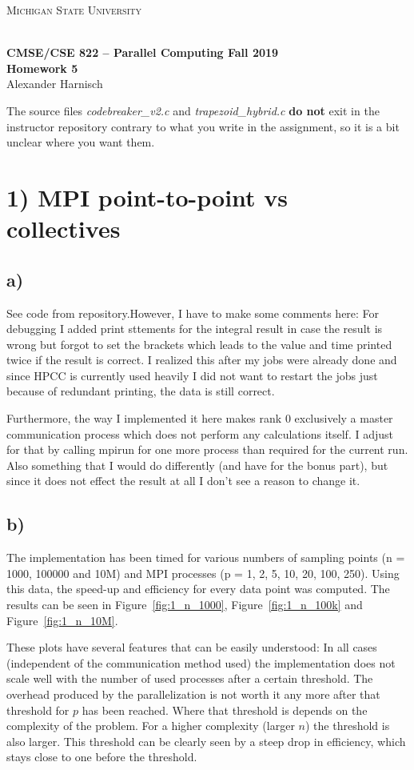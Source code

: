 \documentclass[a4paper, 11pt]{article}
\begin{document}
\noindent
\centerline{\small{\textsc{Michigan State University}}} \\
\large{\textbf{CMSE/CSE 822 – Parallel Computing \hfill Fall 2019 \\
Homework 5}} \\
Alexander Harnisch \\
\noindent\makebox[\linewidth]{\rule{\textwidth}{0.4pt}}

The source files  \textit{codebreaker\_v2.c} and \textit{trapezoid\_hybrid.c}
\textbf{do not} exit in the instructor repository contrary to what you write in
the assignment, so it is a bit unclear where you want them.

\section*{1) MPI point-to-point vs collectives}
\subsection*{a)}
See code from repository.However, I have to make some comments here:
For debugging I added print sttements for the integral result in case the
result is wrong but forgot to set the brackets which leads to the value and
time printed twice if the result is correct. I realized this after my jobs were
already done and since HPCC is currently used heavily I did not want to restart
the jobs just because of redundant printing, the data is still correct.

Furthermore, the way I implemented it here makes rank 0 exclusively a master
communication process which does not perform any calculations itself. I adjust
for that by calling mpirun for one more process than required for the current
run. Also something that I would do differently (and have for the bonus part),
but since it does not effect the result at all I don't see a reason to change
it.

\FloatBarrier
\subsection*{b)}
The implementation has been timed for various numbers of sampling points (n =
1000, 100000 and 10M) and MPI processes (p = 1, 2, 5, 10, 20, 100, 250). Using
this data, the speed-up and efficiency for every data point was computed. The
results can be seen in Figure~\ref{fig:1_n_1000}, Figure~\ref{fig:1_n_100k} and
Figure~\ref{fig:1_n_10M}.

These plots have several features that can be easily understood: In all cases
(independent of the communication method used) the implementation does not
scale well with the number of used processes after a certain threshold. The
overhead produced by the parallelization is not worth it any more after that
threshold for $p$ has been reached. Where that threshold is depends on the
complexity of the problem.  For a higher complexity (larger $n$) the threshold
is also larger. This threshold can be clearly seen by a steep drop in
efficiency, which stays close to one before the threshold. 
\end{document}

